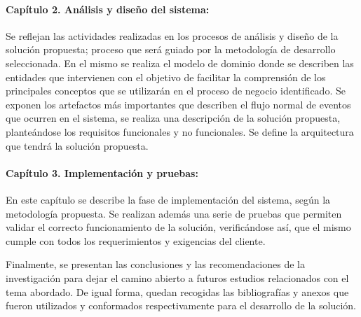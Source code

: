 \paragraph*{Capítulo 2. Análisis y diseño del sistema:} Se reflejan las actividades realizadas en los procesos de análisis y diseño de la solución propuesta; proceso que será guiado por la metodología de desarrollo seleccionada. En el mismo se realiza el modelo de dominio donde se describen las entidades que intervienen con el objetivo de facilitar la comprensión de los principales conceptos que se utilizarán en el proceso de negocio identificado. Se exponen los artefactos más importantes que describen el flujo normal de eventos que ocurren en el sistema, se realiza una descripción de la solución propuesta, planteándose los requisitos funcionales y no funcionales. Se define la arquitectura que tendrá la solución propuesta.

\paragraph*{Capítulo 3. Implementación y pruebas:} En este capítulo se describe la fase de implementación del sistema, según la metodología propuesta. Se realizan además una serie de pruebas que permiten validar el correcto funcionamiento de  la solución, verificándose así, que el mismo cumple con todos los requerimientos y exigencias del cliente.

\vspace*{1.5em}

Finalmente, se presentan las conclusiones y las recomendaciones de la investigación para dejar el camino abierto a futuros estudios relacionados con el tema abordado.
De igual forma, quedan recogidas las bibliografías y anexos que fueron utilizados y conformados respectivamente para el desarrollo de la solución.